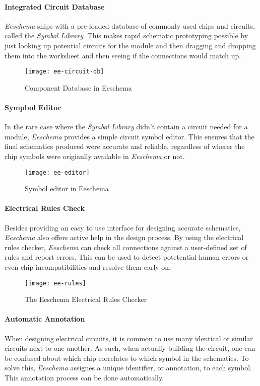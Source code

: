 \paragraph{Integrated Circuit Database}
\emph{Eeschema} ships with a pre-loaded database of commonly used chips and circuits, called the \emph{Symbol Library}.
This makes rapid schematic prototyping possible by just looking up potential circuits for the module and then dragging and dropping
them into the worksheet and then seeing if the connections would match up.

\begin{figure}[h]
  \centering
  \texttt{[image: ee-circuit-db]}
  \caption{Component Database in Eeschema}
  \label{ee-circuit-db}
\end{figure}

\paragraph{Sympbol Editor}
In the rare case where the \emph{Symbol Library} didn't contain a circuit needed for a module, \emph{Eeschema} provides
a simple circuit symbol editor. This ensures that the final schematics produced were accurate and reliable, regardless of wherer
the chip symbols were origianlly available in \emph{Eeschema} or not.

\begin{figure}[h]
  \centering
  \texttt{[image: ee-editor]}
  \caption{Symbol editor in Eeschema}
  \label{ee-editor}
\end{figure}

\paragraph{Electrical Rules Check}
Besides providing an easy to use interface for designing accurate schematics, \emph{Eeschema} also offers active help in the
design process. By using the electrical rules checker, \emph{Eeschema} can check all connections against a user-defined set of
rules and report errors. This can be used to detect potetential human errors or even chip incompatibilities and resolve them
early on.

\begin{figure}[h]
  \centering
  \texttt{[image: ee-rules]}
  \caption{The Eeschema Electrical Rules Checker}
  \label{ee-rules}
\end{figure}

\paragraph{Automatic Annotation}
When designing electrical circuits, it is common to use many identical or similar circuits next to one another. As such,
when actually building the circuit, one can be confused about which chip correlates to which symbol in the schematics.
To solve this, \emph{Eeschema} assignes a unique identifier, or annotation, to each symbol. This annotation process can be
done automatically.

